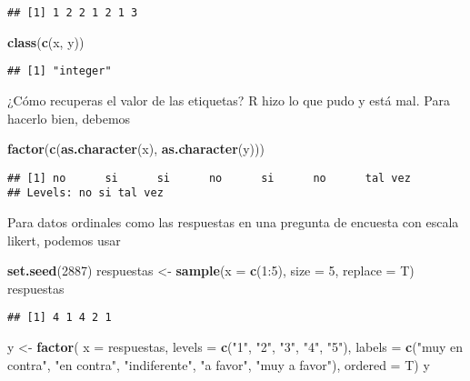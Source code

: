 \documentclass[]{article}
\newenvironment{Shaded}{\begin{snugshade}}{\end{snugshade}}
\newcommand{\KeywordTok}[1]{\textcolor[rgb]{0.13,0.29,0.53}{\textbf{{#1}}}}
\newcommand{\DataTypeTok}[1]{\textcolor[rgb]{0.13,0.29,0.53}{{#1}}}
\newcommand{\DecValTok}[1]{\textcolor[rgb]{0.00,0.00,0.81}{{#1}}}
\newcommand{\StringTok}[1]{\textcolor[rgb]{0.31,0.60,0.02}{{#1}}}
\newcommand{\NormalTok}[1]{{#1}}
\begin{document}
\begin{verbatim}
## [1] 1 2 2 1 2 1 3
\end{verbatim}

\begin{Shaded}
\begin{Highlighting}[]
\KeywordTok{class}\NormalTok{(}\KeywordTok{c}\NormalTok{(x, y))}
\end{Highlighting}
\end{Shaded}

\begin{verbatim}
## [1] "integer"
\end{verbatim}

¿Cómo recuperas el valor de las etiquetas? R hizo lo que pudo y está
mal. Para hacerlo bien, debemos

\begin{Shaded}
\begin{Highlighting}[]
\KeywordTok{factor}\NormalTok{(}\KeywordTok{c}\NormalTok{(}\KeywordTok{as.character}\NormalTok{(x), }\KeywordTok{as.character}\NormalTok{(y)))}
\end{Highlighting}
\end{Shaded}

\begin{verbatim}
## [1] no      si      si      no      si      no      tal vez
## Levels: no si tal vez
\end{verbatim}

Para datos ordinales como las respuestas en una pregunta de encuesta con
escala likert, podemos usar

\begin{Shaded}
\begin{Highlighting}[]
\KeywordTok{set.seed}\NormalTok{(}\DecValTok{2887}\NormalTok{)}
\NormalTok{respuestas <-}\StringTok{ }\KeywordTok{sample}\NormalTok{(}\DataTypeTok{x =} \KeywordTok{c}\NormalTok{(}\DecValTok{1}\NormalTok{:}\DecValTok{5}\NormalTok{), }\DataTypeTok{size =} \DecValTok{5}\NormalTok{, }\DataTypeTok{replace =}  \NormalTok{T)}
\NormalTok{respuestas }
\end{Highlighting}
\end{Shaded}

\begin{verbatim}
## [1] 4 1 4 2 1
\end{verbatim}

\begin{Shaded}
\begin{Highlighting}[]
\NormalTok{y <-}\StringTok{ }\KeywordTok{factor}\NormalTok{(}
  \DataTypeTok{x =} \NormalTok{respuestas,}
  \DataTypeTok{levels =} \KeywordTok{c}\NormalTok{(}\StringTok{"1"}\NormalTok{, }\StringTok{"2"}\NormalTok{, }\StringTok{"3"}\NormalTok{, }\StringTok{"4"}\NormalTok{, }\StringTok{"5"}\NormalTok{),}
  \DataTypeTok{labels =} \KeywordTok{c}\NormalTok{(}\StringTok{"muy en contra"}\NormalTok{, }\StringTok{"en contra"}\NormalTok{, }\StringTok{"indiferente"}\NormalTok{, }\StringTok{"a favor"}\NormalTok{, }\StringTok{"muy a favor"}\NormalTok{),}
  \DataTypeTok{ordered =} \NormalTok{T)}
\NormalTok{y}
\end{Highlighting}
\end{Shaded}
\end{document}
